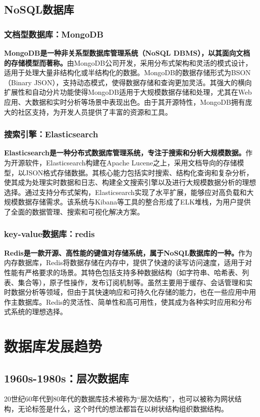 \documentclass[11pt, a4paper, oneside, UTF8]{ctexbook}
\begin{document}
\subsection{NoSQL数据库}
\subsubsection{文档型数据库：MongoDB}
\textbf{MongoDB是一种非关系型数据库管理系统（NoSQL DBMS），以其面向文档的存储模型而著称。}由MongoDB公司开发，采用分布式架构和灵活的模式设计，适用于处理大量非结构化或半结构化的数据。MongoDB的数据存储形式为BSON（Binary JSON），支持动态模式，使得数据存储和查询更加灵活。其强大的横向扩展性和自动分片功能使得MongoDB适用于大规模数据存储和处理，尤其在Web应用、大数据和实时分析等场景中表现出色。由于其开源特性，MongoDB拥有庞大的社区支持，为开发人员提供了丰富的资源和工具。
\subsubsection{搜索引擎：Elasticsearch}
\textbf{Elasticsearch是一种分布式数据库管理系统，专注于搜索和分析大规模数据。}作为开源软件，Elasticsearch构建在Apache Lucene之上，采用文档导向的存储模型，以JSON格式存储数据。其核心能力包括实时搜索、结构化查询和复杂分析，使其成为处理实时数据和日志、构建全文搜索引擎以及进行大规模数据分析的理想选择。通过支持分布式架构，Elasticsearch实现了水平扩展，能够应对高负载和大规模数据存储需求。该系统与Kibana等工具的整合形成了ELK堆栈，为用户提供了全面的数据管理、搜索和可视化解决方案。
\subsubsection{key-value数据库：redis}
\textbf{Redis是一款开源、高性能的键值对存储系统，属于NoSQL数据库的一种。}作为内存数据库，Redis将数据存储在内存中，提供了快速的读写访问速度，适用于对性能有严格要求的场景。其特色包括支持多种数据结构（如字符串、哈希表、列表、集合等），原子性操作，发布订阅机制等。虽然主要用于缓存、会话管理和实时数据分析等领域，但由于其快速响应和可持久化存储的能力，也在一些应用中用作主数据库。Redis的灵活性、简单性和高可用性，使其成为各种实时应用和分布式系统的理想选择。
\section{数据库发展趋势}
\subsection{1960s-1980s：层次数据库}
20世纪60年代到80年代的数据库技术被称为“层次结构”，也可以被称为网状结
构，无论标签是什么，这个时代的想法都旨在以树状结构组织数据结构。
\end{document}
